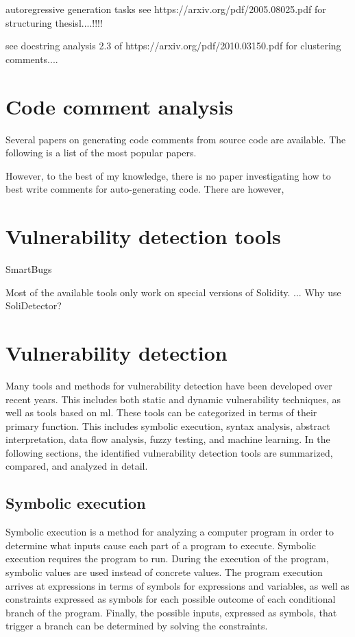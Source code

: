 
autoregressive generation tasks
see https://arxiv.org/pdf/2005.08025.pdf for structuring thesisl....!!!!

see docstring analysis 2.3 of https://arxiv.org/pdf/2010.03150.pdf for clustering comments....


\section{Code comment analysis}
\label{sec:code-comment-analysis}

Several papers on generating code comments from source code are available. The following is a list of the most popular papers.

However, to the best of my knowledge, there is no paper investigating how to best write comments for auto-generating code. There are however, 


\section{Vulnerability detection tools}
\label{sec:vulnerability-detection-tools}



SmartBugs

Most of the available tools only work on special versions of Solidity. ... Why use SoliDetector?


\section{Vulnerability detection}
\label{sec:vulnerability-detection}
Many tools and methods for vulnerability detection have been developed over recent years. This includes both static and dynamic vulnerability techniques, as well as tools based on \acrfull{ml}. These tools can be categorized in terms of their primary function. This includes symbolic execution, syntax analysis, abstract interpretation, data flow analysis, fuzzy testing, and machine learning. In the following sections, the identified vulnerability detection tools are summarized, compared, and analyzed in detail.

\subsection{Symbolic execution}
\label{sec:symbolic-execution}
Symbolic execution is a method for analyzing a computer program in order to determine what inputs cause each part of a program to execute. Symbolic execution requires the program to run. During the execution of the program, symbolic values are used instead of concrete values. The program execution arrives at expressions in terms of symbols for expressions and variables, as well as constraints expressed as symbols for each possible outcome of each conditional branch of the program. Finally, the possible inputs, expressed as symbols, that trigger a branch can be determined by solving the constraints.

